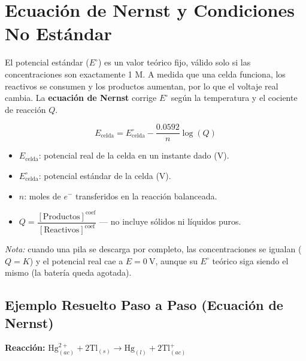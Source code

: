 \documentclass[letterpaper, 12pt, twoside]{article}
\newenvironment{formulabox}[1]{%
    \begin{tcolorbox}[colback=rojoSuave, colframe=rojoFuerte,
        title=\textbf{#1}, fonttitle=\bfseries]
}{%
    \end{tcolorbox}
}
\begin{document}
\endgroup
\thispagestyle{fancy}
\newpage
\section*{Ecuación de Nernst y Condiciones No Estándar}

El potencial estándar ($E^\circ$) es un valor teórico fijo, válido solo si las concentraciones son exactamente 1 M. A medida que una celda funciona, los reactivos se consumen y los productos aumentan, por lo que el voltaje real cambia. La \textbf{ecuación de Nernst} corrige $E^\circ$ según la temperatura y el cociente de reacción $Q$.

\begin{formulabox}{Ecuación de Nernst}
    \[ E_{\text{celda}} = E^\circ_{\text{celda}} - \frac{0.0592}{n}\log(Q) \]
    \begin{itemize}[leftmargin=15pt, topsep=2pt, itemsep=0pt]
    \vspace{0.25cm}
        \item $E_{\text{celda}}$: potencial real de la celda en un instante dado (V).
          \vspace{0.25cm}
        \item $E^\circ_{\text{celda}}$: potencial estándar de la celda (V).
          \vspace{0.25cm}
        \item $n$: moles de $e^-$ transferidos en la reacción balanceada.
          \vspace{0.25cm}
        \item $Q = \dfrac{[\text{Productos}]^{\text{coef}}}{[\text{Reactivos}]^{\text{coef}}}$ — no incluye sólidos ni líquidos puros.

    \end{itemize}
    \vspace{0.2cm}
    \textit{Nota:} cuando una pila se descarga por completo, las concentraciones se igualan ($Q = K$) y el potencial real cae a $E = 0\ \text{V}$, aunque su $E^\circ$ teórico siga siendo el mismo (la batería queda agotada).
\end{formulabox}
\subsection*{Ejemplo Resuelto Paso a Paso (Ecuación de Nernst)}
\textbf{Reacción:} $\mathrm{Hg}^{2+}_{(ac)} + 2\mathrm{Tl}_{(s)} \rightarrow \mathrm{Hg}_{(l)} + 2\mathrm{Tl}^+_{(ac)}$
\end{document}
